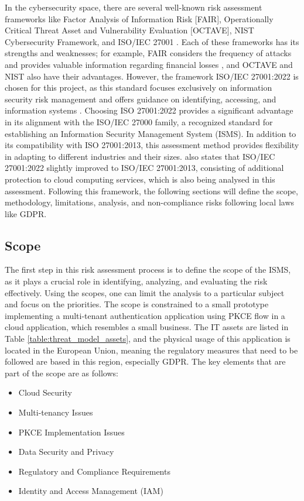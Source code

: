 In the cybersecurity space, there are several well-known risk assessment frameworks like Factor Analysis of Information Risk [FAIR], Operationally Critical Threat Asset and Vulnerability Evaluation [OCTAVE], NIST Cybersecurity Framework, and ISO/IEC 27001 \citep{cybersec_risk_frameworks}. Each of these frameworks has its strengths and weaknesses; for example, FAIR considers the frequency of attacks and provides valuable information regarding financial losses \citep{fair_bn}, and OCTAVE and NIST also have their advantages. However, the framework ISO/IEC 27001:2022 is chosen for this project, as this standard focuses exclusively on information security risk management and offers guidance on identifying, accessing, and information systems \citep{iso}. Choosing ISO 27001:2022 provides a significant advantage in its alignment with the ISO/IEC 27000 family, a recognized standard for establishing an Information Security Management System (ISMS). In addition to its compatibility with ISO 27001:2013, this assessment method provides flexibility in adapting to different industries and their sizes. \cite{iso_2700:2022} also states that ISO/IEC 27001:2022 slightly improved to ISO/IEC 27001:2013, consisting of additional protection to cloud computing services, which is also being analysed in this assessment. Following this framework, the following sections will define the scope, methodology, limitations, analysis, and non-compliance risks following local laws like GDPR. 


\subsection{Scope}
The first step in this risk assessment process is to define the scope of the ISMS, as it plays a crucial role in identifying, analyzing, and evaluating the risk effectively. Using the scopes, one can limit the analysis to a particular subject and focus on the priorities. The scope is constrained to a small prototype implementing a multi-tenant authentication application using PKCE flow in a cloud application, which resembles a small business. The IT assets are listed in Table \ref{table:threat_model_assets}, and the physical usage of this application is located in the European Union, meaning the regulatory measures that need to be followed are based in this region, especially GDPR. The key elements that are part of the scope are as follows:
\begin{itemize}
    \item Cloud Security
    \item Multi-tenancy Issues
    \item PKCE Implementation Issues
    \item Data Security and Privacy
    \item Regulatory and Compliance Requirements
    \item Identity and Access Management (IAM)
\end{itemize}

